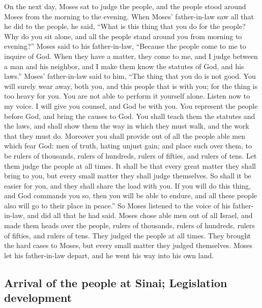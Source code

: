  On the next day, Moses sat to judge the people, and the
people stood around Moses from the morning to the evening.
 When Moses' father-in-law saw all that he did to the
people, he said, ``What is this thing that you do for the people? Why do
you sit alone, and all the people stand around you from morning to
evening?''  Moses said to his father-in-law, ``Because
the people come to me to inquire of God.  When they have
a matter, they come to me, and I judge between a man and his neighbor,
and I make them know the statutes of God, and his laws.''
 Moses' father-in-law said to him, ``The thing that you
do is not good.  You will surely wear away, both you, and
this people that is with you; for the thing is too heavy for you. You
are not able to perform it yourself alone.  Listen now to
my voice. I will give you counsel, and God be with you. You represent
the people before God, and bring the causes to God.  You
shall teach them the statutes and the laws, and shall show them the way
in which they must walk, and the work that they must do. 
Moreover you shall provide out of all the people able men which fear
God: men of truth, hating unjust gain; and place such over them, to be
rulers of thousands, rulers of hundreds, rulers of fifties, and rulers
of tens.  Let them judge the people at all times. It
shall be that every great matter they shall bring to you, but every
small matter they shall judge themselves. So shall it be easier for you,
and they shall share the load with you.  If you will do
this thing, and God commands you so, then you will be able to endure,
and all these people also will go to their place in peace.''
 So Moses listened to the voice of his father-in-law, and
did all that he had said.  Moses chose able men out of
all Israel, and made them heads over the people, rulers of thousands,
rulers of hundreds, rulers of fifties, and rulers of tens.
 They judged the people at all times. They brought the
hard cases to Moses, but every small matter they judged themselves.
 Moses let his father-in-law depart, and he went his way
into his own land.

\hypertarget{arrival-of-the-people-at-sinai-legislation-development}{%
\subsection{Arrival of the people at Sinai; Legislation
development}\label{arrival-of-the-people-at-sinai-legislation-development}}

